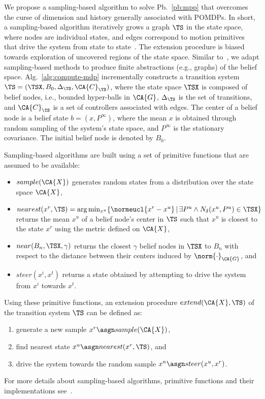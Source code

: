 We propose a sampling-based algorithm to solve Pb.~\ref{pb:mpp}
that overcomes the curse of dimension and history generally associated with POMDPs.
In short, a sampling-based algorithm iteratively grows a graph $\TS$
in the state space, where nodes are individual states, and edges 
correspond to motion primitives that drive the system from state to state~\cite{Lav06}.
The extension procedure is biased towards exploration of
uncovered regions of the state space.
Similar to~\cite{Agha14}, we adapt sampling-based
methods to produce finite abstractions (e.g., graphs) of the belief space.
Alg.~\ref{alg:compute-mdp} incrementally constructs
a transition system $\TS = (\TSX, B_0, \Delta_\TS, \CA{C}_\TS)$,
where the state space $\TSX$ is composed of
belief nodes, i.e., bounded hyper-balls in $\CA{G}$,
$ \Delta_\TS$ is the set of transitions, and $\CA{C}_\TS$ is a set
of controllers associated with edges.
The center of a belief node is a belief state $b=(x, P^\infty)$,
where the mean $x$ is obtained through random sampling of
the system's state space, and $P^\infty$ is the stationary covariance.
The initial belief node is denoted by $B_0$.

Sampling-based algorithms are built using a set of primitive
functions that are assumed to be available:
\begin{itemize}
  \item $sample(\CA{X})$ generates random states
from a distribution over the state space $\CA{X}$,
  \item $nearest(x^r, \TS) = \arg\min_{x^u}\{ \normeucl{x^r-x^u} \,|\, \exists P^u \wedge N_\delta(x^u, P^u) \in \TSX \}$
  returns the mean $x^u$ of a belief node's center in $\TS$ such that $x^u$ is closest
  to the state $x^r$ using the metric defined on $\CA{X}$,
  \item $near(B_n, \TSX, \gamma)$ returns the closest $\gamma$
belief nodes in $\TSX$ to $B_n$ with respect to the distance between their centers
induced by $\norm{\cdot}_\CA{G}$, and
  \item $steer(x^i, x^t)$ returns a state obtained by
attempting to drive the system from $x^i$ towards $x^t$.
\end{itemize}
Using these primitive functions, an extension procedure
$extend(\CA{X}, \TS)$ of the transition system $\TS$
can be defined as:
\begin{enumerate}
  \item generate a new sample $x^r \asgn sample(\CA{X})$,
  \item find nearest state $x^u \asgn nearest(x^r, \TS)$, and
  \item drive the system towards the random sample
$x^n \asgn steer(x^u, x^r)$.
\end{enumerate}
For more details about sampling-based algorithms,
primitive functions and their implementations
see~\cite{Lav06,KF-IJRR11,VaBe-IROS-2013}.

